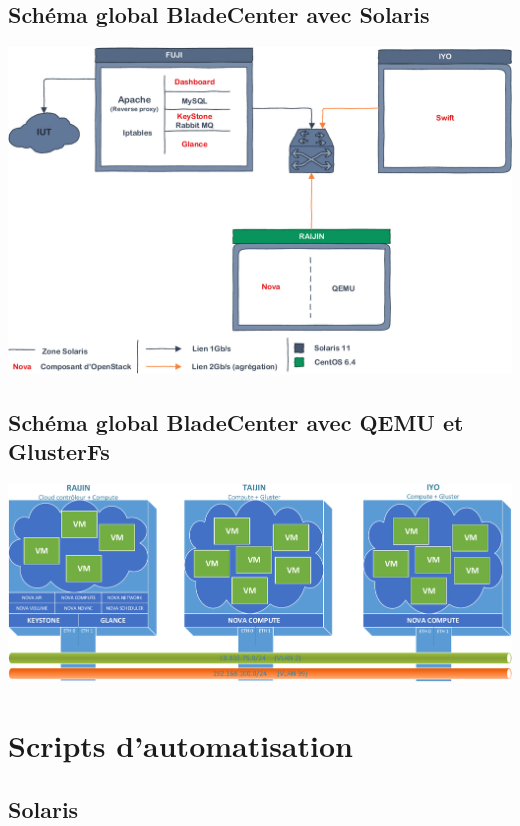 \documentclass[a4paper,oneside]{report}
\begin{document}
\section{Schéma global BladeCenter avec Solaris} \label{sch:glob}
\begin{center}
\includegraphics[scale=0.8,angle=90]{images/topoBladeSolaris-crop.pdf}
\end{center}
\section{Schéma global BladeCenter avec QEMU et GlusterFs}

\begin{center}
\includegraphics[scale=0.8,angle=90]{images/SchemaBladeQemuGlut-crop.pdf}
\end{center}

\chapter{Scripts d'automatisation}
\section{Solaris}
\end{document}
